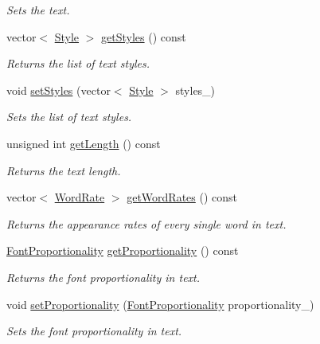 \begin{CompactItemize}
\begin{CompactList}\small\item\em Sets the text. \item\end{CompactList}\item 
vector$<$ \hyperlink{class_style}{Style} $>$ \hyperlink{class_text_5d0279f5ce832a447c68b99182753928}{getStyles} () const 
\begin{CompactList}\small\item\em Returns the list of text styles. \item\end{CompactList}\item 
void \hyperlink{class_text_84a3f53c167e11c2ef455fa8a26bb15f}{setStyles} (vector$<$ \hyperlink{class_style}{Style} $>$ styles\_\-)
\begin{CompactList}\small\item\em Sets the list of text styles. \item\end{CompactList}\item 
unsigned int \hyperlink{class_text_ea91ea415ed40d6cd0aff9063d72756e}{getLength} () const 
\begin{CompactList}\small\item\em Returns the text length. \item\end{CompactList}\item 
vector$<$ \hyperlink{_word_rate_8h_e8f43926daba5798edbb3cb94ad07ff7}{WordRate} $>$ \hyperlink{class_text_2fd83be91d5ba2c24fd44df45efc92c9}{getWordRates} () const 
\begin{CompactList}\small\item\em Returns the appearance rates of every single word in text. \item\end{CompactList}\item 
\hyperlink{_font_proportionality_8h_a9aa255df24db58a9b4cbc46941f2ac1}{FontProportionality} \hyperlink{class_text_fa8149d9658fd279eb2f6c6c967b3bb5}{getProportionality} () const 
\begin{CompactList}\small\item\em Returns the font proportionality in text. \item\end{CompactList}\item 
void \hyperlink{class_text_3e99161a047df59a078043ca6c128788}{setProportionality} (\hyperlink{_font_proportionality_8h_a9aa255df24db58a9b4cbc46941f2ac1}{FontProportionality} proportionality\_\-)
\begin{CompactList}\small\item\em Sets the font proportionality in text. \item\end{CompactList}\end{CompactItemize}
